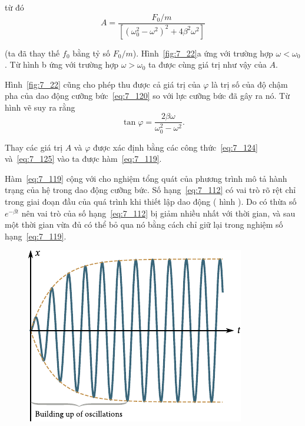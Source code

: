 \noindent
từ đó
\begin{equation}\label{eq:7_124}
	A = \frac{F_0/m}{\left[\left(\omega_0^2 - \omega^2\right)^2 + 4\beta^2\omega^2\right]}
\end{equation}

\noindent
(ta đã thay thế $f_0$ bằng tỷ số $F_0/m$). Hình~\ref{fig:7_22}a ứng với trường hợp $\omega<\omega_0$. Từ hình b ứng với trường hợp $\omega>\omega_0$ ta được cùng giá trị như vậy của $A$.

Hình~\ref{fig:7_22} cũng cho phép thu được cả giá trị của $\varphi$ là trị số của độ chậm pha của dao động cưỡng bức~\eqref{eq:7_120} so với lực cưỡng bức đã gây ra nó. Từ hình vẽ suy ra rằng
\begin{equation}\label{eq:7_125}
	\tan\varphi = \frac{2\beta\omega}{\omega_0^2 - \omega^2}.
\end{equation}

\noindent
Thay các giá trị $A$ và $\varphi$ được xác định bằng các công thức~\eqref{eq:7_124} và~\eqref{eq:7_125} vào  ta được hàm~\eqref{eq:7_119}.

Hàm~\eqref{eq:7_119} cộng với  cho nghiệm tổng quát của phương trình  mô tả hành trạng của hệ trong dao động cưỡng bức. Số hạng~\eqref{eq:7_112} có vai trò rõ rệt chỉ trong giai đoạn đầu của quá trình khi thiết lập dao động ( hình ). Do có thừa số $e^{-\beta t}$ nên vai trò của số hạng~\eqref{eq:7_112}  bị giảm nhiều nhất với thời gian, và sau một thời gian vừa đủ có thể bỏ qua nó bằng cách chỉ giữ lại trong nghiệm số hạng~\eqref{eq:7_119}.

\begin{figure}[!htb]
	\begin{center}
		\includegraphics[scale=0.95]{figures/ch_07/fig_7_23.pdf}
		\caption[]{}
		\label{fig:7_23}
	\end{center}
	\vspace{-0.8cm}
\end{figure}

